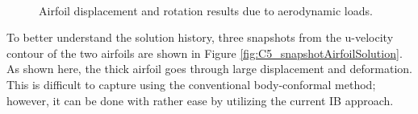 %
\begin{figure}[H]
    \centering
    \quad
    \\
    \quad
    \caption{Airfoil displacement and rotation results due to aerodynamic loads.}
    \label{fig:C5_airfoilDisplacementRotation}
\end{figure}
%
To better understand the solution history, three snapshots from the u-velocity contour of the two airfoils are shown in Figure \ref{fig:C5_snapshotAirfoilSolution}. As shown here, the thick airfoil goes through large displacement and deformation. This is difficult to capture using the conventional body-conformal method; however, it can be done with rather ease by utilizing the current IB approach.
